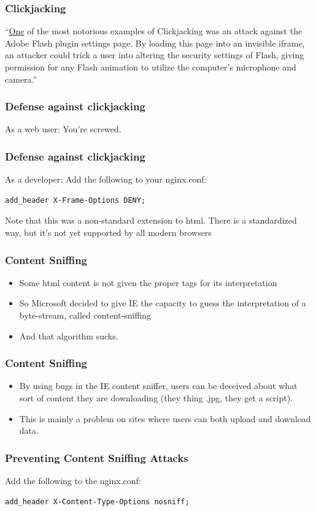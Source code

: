\documentclass[9pt]{beamer}
\begin{document}
\begin{frame}[fragile]
\frametitle{Clickjacking}
``\href{https://www.owasp.org/index.php/Clickjacking}{One} of the most notorious examples of Clickjacking was an attack against the Adobe Flash plugin settings page. By loading this page into an invisible iframe, an attacker could trick a user into altering the security settings of Flash, giving permission for any Flash animation to utilize the computer's microphone and camera.''
\end{frame}

\begin{frame}[fragile]
\frametitle{Defense against clickjacking}
As a web user: You're screwed.
\end{frame}

\begin{frame}[fragile]
\frametitle{Defense against clickjacking}

As a developer: Add the following to your nginx.conf:
\begin{verbatim}
add_header X-Frame-Options DENY;
\end{verbatim}
Note that this was a non-standard extension to html. There is a standardized way, but it's not yet supported by all modern browsers
\end{frame}


\begin{frame}[fragile]
\frametitle{Content Sniffing}
\begin{itemize}
\item Some html content is not given the proper tags for its interpretation
\item So Microsoft decided to give IE the capacity to guess the interpretation of a byte-stream, called content-sniffing
\item And that algorithm sucks.
\end{itemize}
\end{frame}

\begin{frame}[fragile]
\frametitle{Content Sniffing}
\begin{itemize}
\item By using bugs in the IE content sniffer, users can be deceived about what sort of content they are downloading (they thing .jpg, they get a script).

\item This is mainly a problem on sites where users can both upload and download data.
\end{itemize}
\end{frame}

\begin{frame}[fragile]
\frametitle{Preventing Content Sniffing Attacks}
Add the following to the nginx.conf:
\begin{verbatim}
add_header X-Content-Type-Options nosniff;
\end{verbatim}
\end{frame}
\end{document}
